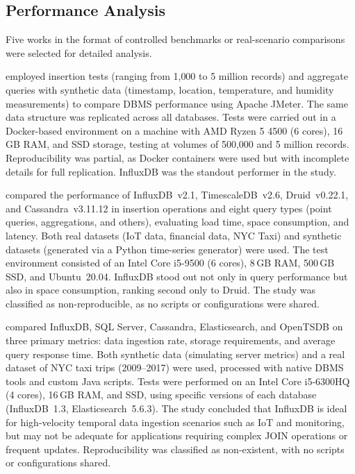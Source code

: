 \subsection{Performance Analysis}

Five works in the format of controlled benchmarks or real-scenario comparisons were selected
for detailed analysis.

\cite{lima2024avaliando} employed insertion tests (ranging from 1{,}000 to 5 million records)
and aggregate queries with synthetic data (timestamp, location, temperature, and humidity
measurements) to compare DBMS performance using Apache JMeter. The same data structure was
replicated across all databases. Tests were carried out in a Docker-based environment on a
machine with AMD Ryzen 5 4500 (6 cores), 16\,GB RAM, and SSD storage, testing at volumes of
500{,}000 and 5 million records. Reproducibility was partial, as Docker containers were used
but with incomplete details for full replication. InfluxDB was the standout performer in
the study.

\cite{shah2022performance} compared the performance of InfluxDB~v2.1, TimescaleDB~v2.6,
Druid~v0.22.1, and Cassandra~v3.11.12 in insertion operations and eight query types (point
queries, aggregations, and others), evaluating load time, space consumption, and latency.
Both real datasets (IoT data, financial data, NYC Taxi) and synthetic datasets (generated via
a Python time-series generator) were used. The test environment consisted of an Intel Core
i5-9500 (6 cores), 8\,GB RAM, 500\,GB SSD, and Ubuntu~20.04. InfluxDB stood out not only
in query performance but also in space consumption, ranking second only to Druid. The study
was classified as non-reproducible, as no scripts or configurations were shared.

\cite{naqvi2017influxdb} compared InfluxDB, SQL Server, Cassandra, Elasticsearch, and OpenTSDB
on three primary metrics: data ingestion rate, storage requirements, and average query response
time. Both synthetic data (simulating server metrics) and a real dataset of NYC taxi trips
(2009--2017) were used, processed with native DBMS tools and custom Java scripts. Tests were
performed on an Intel Core i5-6300HQ (4 cores), 16\,GB RAM, and SSD, using specific versions
of each database (InfluxDB~1.3, Elasticsearch~5.6.3). The study concluded that InfluxDB is
ideal for high-velocity temporal data ingestion scenarios such as IoT and monitoring, but may
not be adequate for applications requiring complex JOIN operations or frequent updates.
Reproducibility was classified as non-existent, with no scripts or configurations shared.

